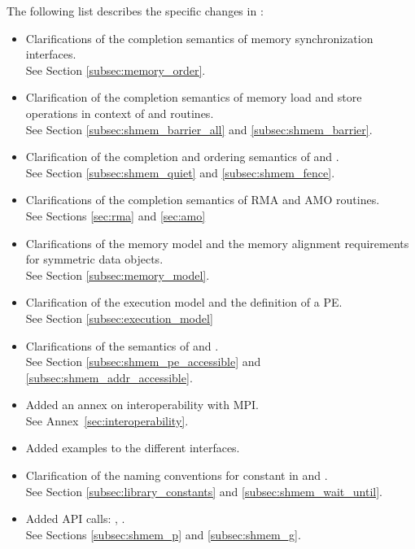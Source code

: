 The following list describes the specific changes in \openshmem[1.1]:
\begin{itemize}
%
\item Clarifications of the completion semantics of memory synchronization
      interfaces.
\\See Section \ref{subsec:memory_order}.
%
\item Clarification of the completion semantics of memory load and store
      operations in context of  and 
      routines.
\\See Section \ref{subsec:shmem_barrier_all} and \ref{subsec:shmem_barrier}.
%
\item Clarification of the completion and ordering semantics of
       and .
\\See Section \ref{subsec:shmem_quiet} and \ref{subsec:shmem_fence}.
%
\item Clarifications of the completion semantics of \ac{RMA} and \ac{AMO}
      routines.
\\See Sections \ref{sec:rma} and \ref{sec:amo}
%
\item Clarifications of the memory model and the memory alignment requirements
      for symmetric data objects.
\\See Section \ref{subsec:memory_model}.
%
\item Clarification of the execution model and the definition of a \ac{PE}.
\\See Section \ref{subsec:execution_model}
%
\item Clarifications of the semantics of  and
      .
\\See Section \ref{subsec:shmem_pe_accessible} and \ref{subsec:shmem_addr_accessible}.
%
\item Added an annex on interoperability with \ac{MPI}.
\\See Annex~\ref{sec:interoperability}.
%
\item Added examples to the different interfaces.
%
\item Clarification of the naming conventions for constant in \Cstd and
      \Fortran.
\\See Section \ref{subsec:library_constants} and \ref{subsec:shmem_wait_until}.
%
\item Added \ac{API} calls: , .
\\See Sections \ref{subsec:shmem_p} and \ref{subsec:shmem_g}.

\end{itemize}
